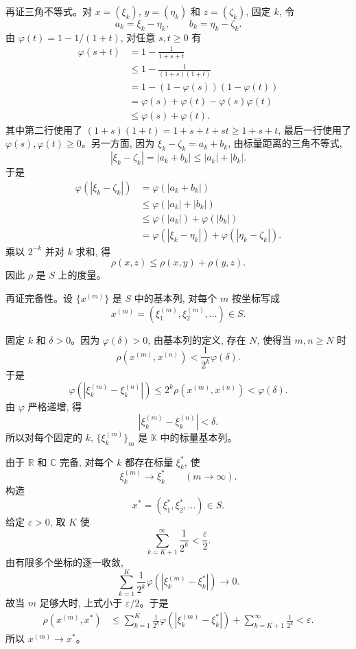 \documentclass[UTF8,a4paper,11pt,fontset=fandol]{ctexart}
\begin{document}
再证三角不等式。对 $x=(\xi_k)$, $y=(\eta_k)$ 和 $z=(\zeta_k)$, 固定 $k$, 令
\[
a_k=\xi_k-\eta_k,\qquad b_k=\eta_k-\zeta_k.
\]
由 $\varphi(t)=1-1/(1+t)$, 对任意 $s,t\geq0$ 有
\[
\begin{aligned}
\varphi(s+t)
&=1-\frac1{1+s+t}\\
&\leq1-\frac1{(1+s)(1+t)}\\
&=1-(1-\varphi(s))(1-\varphi(t))\\
&=\varphi(s)+\varphi(t)-\varphi(s)\varphi(t)\\
&\leq\varphi(s)+\varphi(t).
\end{aligned}
\]
其中第二行使用了 $(1+s)(1+t)=1+s+t+st\geq1+s+t$, 最后一行使用了 $\varphi(s),\varphi(t)\geq0$。另一方面, 因为 $\xi_k-\zeta_k=a_k+b_k$, 由标量距离的三角不等式,
\[
|\xi_k-\zeta_k|=|a_k+b_k|
\leq|a_k|+|b_k|.
\]
于是
\[
\begin{aligned}
\varphi(|\xi_k-\zeta_k|)
&=\varphi(|a_k+b_k|)\\
&\leq\varphi(|a_k|+|b_k|)\\
&\leq\varphi(|a_k|)+\varphi(|b_k|)\\
&=\varphi(|\xi_k-\eta_k|)+\varphi(|\eta_k-\zeta_k|).
\end{aligned}
\]
乘以 $2^{-k}$ 并对 $k$ 求和, 得
\[
\rho(x,z)\leq\rho(x,y)+\rho(y,z).
\]
因此 $\rho$ 是 $S$ 上的度量。

再证完备性。设 $\{x^{(m)}\}$ 是 $S$ 中的基本列, 对每个 $m$ 按坐标写成
\[
x^{(m)}=(\xi^{(m)}_1,\xi^{(m)}_2,\ldots)\in S.
\]

固定 $k$ 和 $\delta>0$。因为 $\varphi(\delta)>0$, 由基本列的定义, 存在 $N$, 使得当 $m,n\geq N$ 时
\[
\rho(x^{(m)},x^{(n)})<\frac1{2^k}\varphi(\delta).
\]
于是
\[
\varphi\left(|\xi^{(m)}_k-\xi^{(n)}_k|\right)
\leq2^k\rho(x^{(m)},x^{(n)})
<\varphi(\delta).
\]
由 $\varphi$ 严格递增, 得
\[
|\xi^{(m)}_k-\xi^{(n)}_k|<\delta.
\]
所以对每个固定的 $k$, $\{\xi^{(m)}_k\}_m$ 是 $\mathbb K$ 中的标量基本列。

由于 $\mathbb R$ 和 $\mathbb C$ 完备, 对每个 $k$ 都存在标量 $\xi_k^*$, 使
\[
\xi^{(m)}_k\longrightarrow\xi_k^*\qquad(m\to\infty).
\]
构造
\[
x^*=(\xi_1^*,\xi_2^*,\ldots)\in S.
\]
给定 $\varepsilon>0$, 取 $K$ 使
\[
\sum_{k=K+1}^{\infty}\frac1{2^k}<\frac\varepsilon2.
\]
由有限多个坐标的逐一收敛,
\[
\sum_{k=1}^{K}\frac1{2^k}
\varphi\left(|\xi^{(m)}_k-\xi_k^*|\right)\longrightarrow0.
\]
故当 $m$ 足够大时, 上式小于 $\varepsilon/2$。于是
\[
\begin{aligned}
\rho(x^{(m)},x^*)
&\leq\sum_{k=1}^{K}\frac1{2^k}
\varphi\left(|\xi^{(m)}_k-\xi_k^*|\right)
 +\sum_{k=K+1}^{\infty}\frac1{2^k}<\varepsilon.
\end{aligned}
\]
所以 $x^{(m)}\to x^*$。
\end{document}
